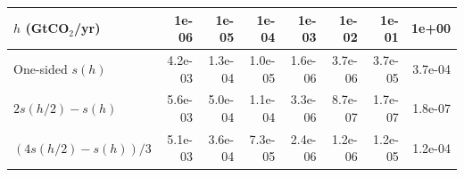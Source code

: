 \begin{tabular}{lrrrrrrr}
\toprule
$h$ (GtCO$_2$/yr) & 1e-06 & 1e-05 & 1e-04 & 1e-03 & 1e-02 & 1e-01 & 1e+00 \\
\midrule
One-sided $s(h)$ & 4.2e-03 & 1.3e-04 & 1.0e-05 & 1.6e-06 & 3.7e-06 & 3.7e-05 & 3.7e-04 \\
$2s(h/2)-s(h)$ & 5.6e-03 & 5.0e-04 & 1.1e-04 & 3.3e-06 & 8.7e-07 & 1.7e-07 & 1.8e-07 \\
$(4s(h/2)-s(h))/3$ & 5.1e-03 & 3.6e-04 & 7.3e-05 & 2.4e-06 & 1.2e-06 & 1.2e-05 & 1.2e-04 \\
\bottomrule
\end{tabular}
